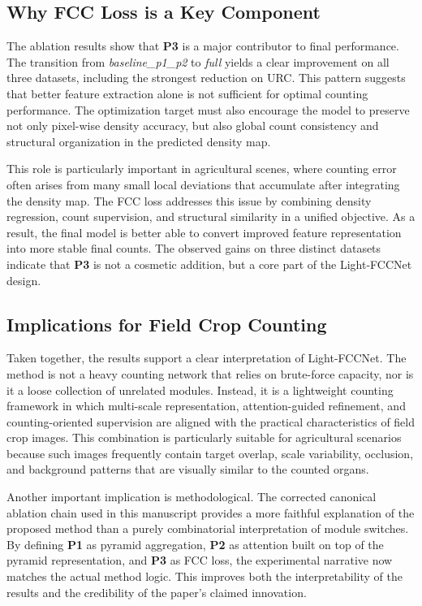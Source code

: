 \documentclass[a4paper,fleqn]{cas-sc}
\begin{document}
\subsection{Why FCC Loss is a Key Component}

The ablation results show that \textbf{P3} is a major contributor to final performance. The transition from \textit{baseline\_p1\_p2} to \textit{full} yields a clear improvement on all three datasets, including the strongest reduction on URC. This pattern suggests that better feature extraction alone is not sufficient for optimal counting performance. The optimization target must also encourage the model to preserve not only pixel-wise density accuracy, but also global count consistency and structural organization in the predicted density map.

This role is particularly important in agricultural scenes, where counting error often arises from many small local deviations that accumulate after integrating the density map. The FCC loss addresses this issue by combining density regression, count supervision, and structural similarity in a unified objective. As a result, the final model is better able to convert improved feature representation into more stable final counts. The observed gains on three distinct datasets indicate that \textbf{P3} is not a cosmetic addition, but a core part of the Light-FCCNet design.

\subsection{Implications for Field Crop Counting}

Taken together, the results support a clear interpretation of Light-FCCNet. The method is not a heavy counting network that relies on brute-force capacity, nor is it a loose collection of unrelated modules. Instead, it is a lightweight counting framework in which multi-scale representation, attention-guided refinement, and counting-oriented supervision are aligned with the practical characteristics of field crop images. This combination is particularly suitable for agricultural scenarios because such images frequently contain target overlap, scale variability, occlusion, and background patterns that are visually similar to the counted organs.

Another important implication is methodological. The corrected canonical ablation chain used in this manuscript provides a more faithful explanation of the proposed method than a purely combinatorial interpretation of module switches. By defining \textbf{P1} as pyramid aggregation, \textbf{P2} as attention built on top of the pyramid representation, and \textbf{P3} as FCC loss, the experimental narrative now matches the actual method logic. This improves both the interpretability of the results and the credibility of the paper's claimed innovation.
\end{document}
